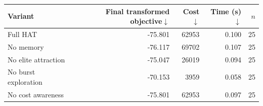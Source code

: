 \begin{tabular}{lrrrr}
\toprule
Variant & Final transformed objective$\downarrow$ & Cost$\downarrow$ & Time (s)$\downarrow$ & $n$ \\
\midrule
Full HAT & -75.801 & 62953 & 0.100 & 25 \\
No memory & -76.117 & 69702 & 0.107 & 25 \\
No elite attraction & -75.047 & 26019 & 0.094 & 25 \\
No burst exploration & -70.153 & 3959 & 0.058 & 25 \\
No cost awareness & -75.801 & 62953 & 0.097 & 25 \\
\bottomrule
\end{tabular}
